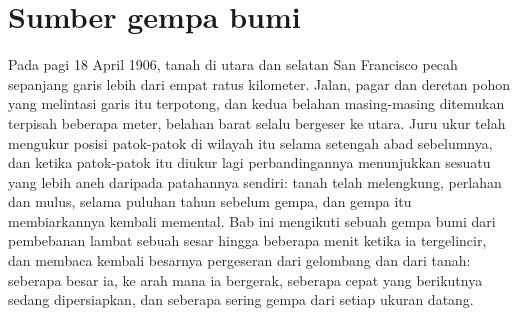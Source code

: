 \chapter{Sumber gempa bumi}\label{ch:b1:earthquake-source}

Pada pagi 18 April 1906, tanah di utara dan selatan San Francisco pecah sepanjang garis lebih dari empat ratus kilometer. Jalan, pagar dan deretan pohon yang melintasi garis itu terpotong, dan kedua belahan masing-masing ditemukan terpisah beberapa meter, belahan barat selalu bergeser ke utara. Juru ukur telah mengukur posisi patok-patok di wilayah itu selama setengah abad sebelumnya, dan ketika patok-patok itu diukur lagi perbandingannya menunjukkan sesuatu yang lebih aneh daripada patahannya sendiri: tanah telah melengkung, perlahan dan mulus, selama puluhan tahun sebelum gempa, dan gempa itu membiarkannya kembali memental. Bab ini mengikuti sebuah gempa bumi dari pembebanan lambat sebuah sesar hingga beberapa menit ketika ia tergelincir, dan membaca kembali besarnya pergeseran dari gelombang dan dari tanah: seberapa besar ia, ke arah mana ia bergerak, seberapa cepat yang berikutnya sedang dipersiapkan, dan seberapa sering gempa dari setiap ukuran datang.

